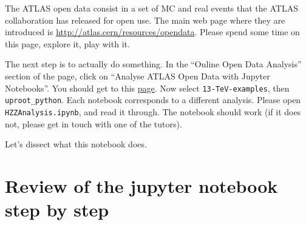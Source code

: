 
The ATLAS open data consist in a set of MC and real events that the ATLAS collaboration has released for open use. The main web page where they are introduced is \url{http://atlas.cern/resources/opendata}. Please spend some time on this page, explore it, play with it.

The next step is to actually do something. In the ``Online Open Data Analysis'' section of the page, click on ``Analyse ATLAS Open Data with Jupyter Notebooks''. You should get to this \href{https://mybinder.org/v2/gh/atlas-outreach-data-tools/notebooks-collection-opendata/master/}{page}. Now select \verb|13-TeV-examples|, then \verb|uproot_python|. Each notebook corresponds to a different analysis. Please open \verb|HZZAnalysis.ipynb|, and read it through. The notebook should work (if it does not, please get in touch with one of the tutors). 

Let's dissect what this notebook does. 

\section{Review of the jupyter notebook step by step}
\label{sec:review_notebook}

